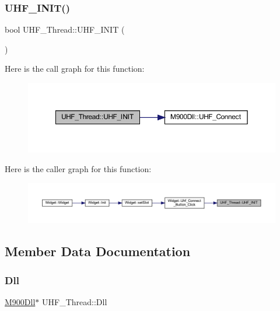 \subsubsection{\texorpdfstring{UHF\_INIT()}{UHF\_INIT()}}
{\footnotesize\ttfamily bool U\+H\+F\+\_\+\+Thread\+::\+U\+H\+F\+\_\+\+I\+N\+IT (\begin{DoxyParamCaption}{ }\end{DoxyParamCaption})}

Here is the call graph for this function\+:
\nopagebreak
\begin{figure}[H]
\begin{center}
\leavevmode
\includegraphics[width=350pt]{class_u_h_f___thread_a8fc7d9ed28c737bc95cc33fc780b8bc2_cgraph}
\end{center}
\end{figure}
Here is the caller graph for this function\+:
\nopagebreak
\begin{figure}[H]
\begin{center}
\leavevmode
\includegraphics[width=350pt]{class_u_h_f___thread_a8fc7d9ed28c737bc95cc33fc780b8bc2_icgraph}
\end{center}
\end{figure}


\subsection{Member Data Documentation}
\mbox{\label{class_u_h_f___thread_aca70040f175e3e6140b6b19c4b84b42b}} 
\subsubsection{\texorpdfstring{Dll}{Dll}}
{\footnotesize\ttfamily \mbox{\hyperlink{class_m900_dll}{M900\+Dll}}$\ast$ U\+H\+F\+\_\+\+Thread\+::\+Dll\hspace{0.3cm}{\ttfamily [private]}}

